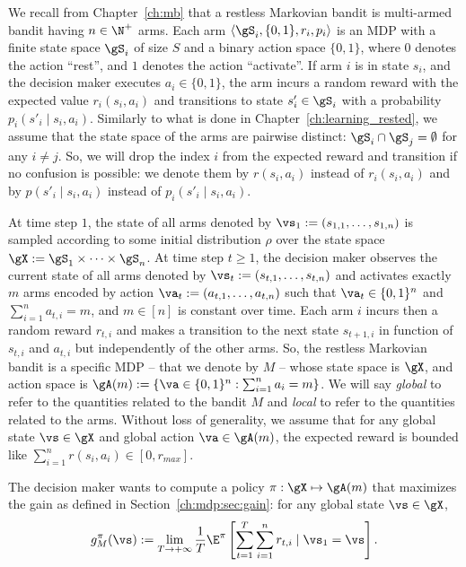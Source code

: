 We recall from Chapter~\ref{ch:mb} that a restless Markovian bandit is multi-armed bandit having $n\in\N^+$ arms.
Each arm $\langle\gS_i, \{0,1\}, r_i, p_i\rangle$ is an MDP with a finite state space $\gS_i$ of size $S$ and a binary action space $\{0,1\}$, where $0$ denotes the action ``rest'', and $1$ denotes the action ``activate''.
If arm $i$ is in state $s_i$, and the decision maker executes $a_i\in\{0,1\}$, the arm incurs a random reward with the expected value $r_i(s_i,a_i)$ and transitions to state $s'_i\in\gS_i$ with a probability $p_i(s'_i\mid s_i,a_i)$.
Similarly to what is done in Chapter~\ref{ch:learning_rested}, we assume that the state space of the arms are pairwise distinct: $\gS_i\cap\gS_j=\emptyset$ for any $i\neq j$.
So, we will drop the index $i$ from the expected reward and transition if no confusion is possible: we denote them by $r(s_i,a_i)$ instead of $r_i(s_i,a_i)$ and by $p(s'_i\mid s_i,a_i)$ instead of $p_i(s'_i\mid s_i,a_i)$.

At time step $1$, the state of all arms denoted by $\vs_1:=(s_{1,1},\dots,s_{1,n})$ is sampled according to some initial distribution $\rho$ over the state space $\gX:=\gS_1\times\dots\times\gS_n$.
At time step $t\ge1$, the decision maker observes the current state of all arms denoted by $\vs_t:=(s_{t,1},\dots,s_{t,n})$ and activates exactly $m$ arms encoded by action $\va_t:=(a_{t,1},\dots,a_{t,n})$ such that $\va_t\in\{0,1\}^n$ and $\sum_{i=1}^{n} a_{t,i}=m$, and $m\in[n]$ is constant over time.
Each arm $i$ incurs then a random reward $r_{t,i}$ and makes
a transition to the next state $s_{t+1,i}$ in function of $s_{t,i}$ and $a_{t,i}$ but independently of the other arms.
So, the restless Markovian bandit is a specific MDP -- that we denote by $M$ -- whose state space is $\gX$, and action space is $\gA(m):=\{\va\in\{0,1\}^n : \sum_{i=1}^{n}a_i =m\}$.
We will say \emph{global} to refer to the quantities related to the bandit $M$ and \emph{local} to refer to the quantities related to the arms.
Without loss of generality, we assume that for any global state $\vs\in\gX$ and global action $\va\in\gA(m)$, the expected reward is bounded like $\sum_{i=1}^{n}r(s_i,a_i)\in[0,r_{max}]$.

The decision maker wants to compute a policy $\pi:\gX\mapsto\gA(m)$ that maximizes the gain as defined in Section~\ref{ch:mdp:sec:gain}: for any global state $\vs\in\gX$,
\begin{equation}
    \label{ch:restless:eq:obj}
    g^\pi_M(\vs):=\lim_{T\to+\infty}\frac1T \E^\pi\left[ \sum_{t=1}^{T} \sum_{i=1}^nr_{t,i} \mid \vs_1=\vs\right].
\end{equation}

